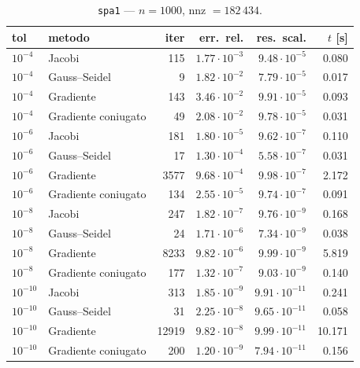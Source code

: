 \documentclass[11pt,a4paper]{article}
\begin{document}
\begin{table}[h]
\centering
\caption{\texttt{spa1} --- $n=1000$, nnz $=182\,434$.}
\begin{tabular}{l l r r r r}
\toprule
tol & metodo & iter & err.\ rel. & res.\ scal. & $t$ [s] \\
\midrule
$10^{-4}$  & Jacobi              & 115   & $1.77\cdot10^{-3}$ & $9.48\cdot10^{-5}$ & 0.080 \\
$10^{-4}$  & Gauss--Seidel       & 9     & $1.82\cdot10^{-2}$ & $7.79\cdot10^{-5}$ & 0.017 \\
$10^{-4}$  & Gradiente           & 143   & $3.46\cdot10^{-2}$ & $9.91\cdot10^{-5}$ & 0.093 \\
$10^{-4}$  & Gradiente coniugato & 49    & $2.08\cdot10^{-2}$ & $9.78\cdot10^{-5}$ & 0.031 \\
\midrule
$10^{-6}$  & Jacobi              & 181   & $1.80\cdot10^{-5}$ & $9.62\cdot10^{-7}$ & 0.110 \\
$10^{-6}$  & Gauss--Seidel       & 17    & $1.30\cdot10^{-4}$ & $5.58\cdot10^{-7}$ & 0.031 \\
$10^{-6}$  & Gradiente           & 3577  & $9.68\cdot10^{-4}$ & $9.98\cdot10^{-7}$ & 2.172 \\
$10^{-6}$  & Gradiente coniugato & 134   & $2.55\cdot10^{-5}$ & $9.74\cdot10^{-7}$ & 0.091 \\
\midrule
$10^{-8}$  & Jacobi              & 247   & $1.82\cdot10^{-7}$ & $9.76\cdot10^{-9}$ & 0.168 \\
$10^{-8}$  & Gauss--Seidel       & 24    & $1.71\cdot10^{-6}$ & $7.34\cdot10^{-9}$ & 0.038 \\
$10^{-8}$  & Gradiente           & 8233  & $9.82\cdot10^{-6}$ & $9.99\cdot10^{-9}$ & 5.819 \\
$10^{-8}$  & Gradiente coniugato & 177   & $1.32\cdot10^{-7}$ & $9.03\cdot10^{-9}$ & 0.140 \\
\midrule
$10^{-10}$ & Jacobi              & 313   & $1.85\cdot10^{-9}$  & $9.91\cdot10^{-11}$ & 0.241 \\
$10^{-10}$ & Gauss--Seidel       & 31    & $2.25\cdot10^{-8}$  & $9.65\cdot10^{-11}$ & 0.058 \\
$10^{-10}$ & Gradiente           & 12919 & $9.82\cdot10^{-8}$  & $9.99\cdot10^{-11}$ & 10.171 \\
$10^{-10}$ & Gradiente coniugato & 200   & $1.20\cdot10^{-9}$  & $7.94\cdot10^{-11}$ & 0.156 \\
\bottomrule
\end{tabular}
\end{table}
\end{document}
